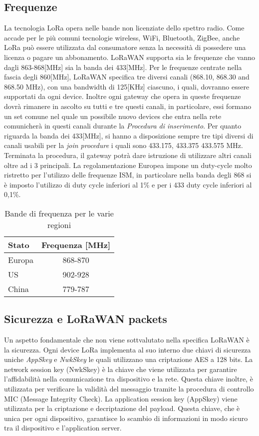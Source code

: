 \subsection{Frequenze}
La tecnologia LoRa opera nelle bande non licenziate dello spettro radio.  Come
accade per le più comuni tecnologie wireless, WiFi, Bluetooth, ZigBee, anche LoRa
può essere utilizzata dal consumatore senza la necessità di possedere una
licenza o pagare un abbonamento. LoRaWAN supporta sia le frequenze che vanno dagli
863-868[MHz] sia la banda dei 433[MHz]. Per le frequenze centrate nella fascia
degli 860[MHz], LoRaWAN specifica tre diversi canali (868.10, 868.30 and 868.50
MHz), con una bandwidth di 125[KHz] ciascuno, i quali, dovranno essere supportati
da ogni device. Inoltre ogni gateway che opera in queste frequenze dovrà
rimanere in ascolto su tutti e tre questi canali, in particolare, essi
formano un set comune nel quale un possibile nuovo devices che entra nella rete
comunicherà in questi canali durante la \emph{Procedura di inserimento}. Per
quanto riguarda la banda dei 433[MHz], si hanno a disposizione sempre tre tipi
diversi di canali usabili per la \emph{join procedure} i quali sono 433.175, 
433.375  433.575 MHz. Terminata la procedura, il gateway potrà dare istruzione
di utilizzare altri canali oltre ad i 3 principali.
La regolamentazione Europea impone un duty-cycle molto ristretto per l'utilizzo
delle frequenze ISM, in particolare nella banda degli 868 si è imposto
l'utilizzo di duty cycle inferiori al 1\% e per i 433 duty cycle inferiori al
0,1\%.
\begin{table}[h]
        \centering
        \begin{tabular}{l|c}
                \toprule
                Stato   & Frequenza [MHz] \\
                \hline
                Europa  & 868-870 \\
                US      & 902-928 \\
                China   & 779-787 \\
                \bottomrule
        \end{tabular}
        \caption{Bande di frequenza per le varie regioni}
\end{table}

\subsection{Sicurezza e LoRaWAN packets}
Un aspetto fondamentale che non viene sottvalutato nella specifica LoRaWAN è la
sicurezza. Ogni device LoRa implementa al suo interno due chiavi di sicurezza
uniche \emph{AppSkey} e \emph{NwkSkey} le quali utilizzano una criptazione AES a
128 bits.
La network session key (NwkSkey) è la chiave che viene utilizzata per garantire
l'affidabilità nella comunicazione tra dispositivo e la rete. Questa chiave
inoltre, è utilizzata per verificare la validità del messaggio tramite la
procedura di controllo MIC (Message Integrity Check). 
La application session key (AppSkey) viene utilizzata per la criptazione e
decriptazione del payload. Questa chiave, che è unica per ogni dispositivo,
garantisce lo scambio di informazioni in modo sicuro tra il dispositivo e
l'application server. 

